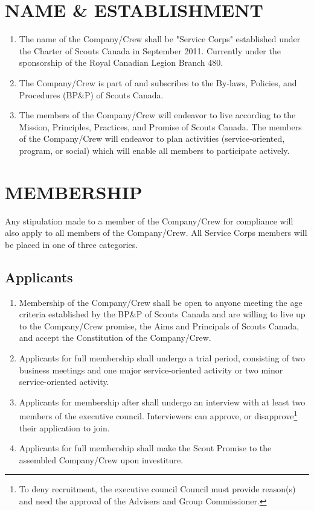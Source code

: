 \documentclass{Service_Corps_Document}
\begin{document}
\def \Title {Constitution}
\def \Company {Service Corps}
\def \versionNumber {4.0}
\stdFooter
\begin{titlepage}
	\stdTitlePage
\end{titlepage}

\tableofcontents	
		
\newpage
\section{NAME \& ESTABLISHMENT}
\begin{enumerate}
	\item The name of the Company/Crew shall be "Service Corps" established under the Charter of Scouts Canada in September 2011.
	Currently under the sponsorship of the Royal Canadian Legion Branch 480.
	\item The Company/Crew is part of and subscribes to the By-laws, Policies, and Procedures (BP\&P) of Scouts Canada.
	\item The members of the Company/Crew will endeavor to live according to the Mission, Principles, Practices, and Promise of Scouts Canada.
	The members of the Company/Crew will endeavor to plan activities (service-oriented, program, or social) which will enable all members to participate actively.
\end{enumerate}	
\section{MEMBERSHIP}
Any stipulation made to a member of the Company/Crew for compliance will also apply to all members of the Company/Crew.
All Service Corps members will be placed in one of three categories.
\subsection{Applicants}
\begin{enumerate}
	\item Membership of the Company/Crew shall be open to anyone meeting the age criteria established by the BP\&P of Scouts Canada and are willing to live up to the Company/Crew promise, the Aims and Principals of Scouts Canada, and accept the Constitution of the Company/Crew. 
	\item Applicants for full membership shall undergo a trial period, consisting of two business meetings and one major service-oriented activity or two minor service-oriented activity.
	\item Applicants for membership after shall undergo an interview with at least two members of the executive council.
	Interviewers can approve, or disapprove\footnote{To deny recruitment, the executive council Council must provide reason(s) and need the approval of the Advisers and Group Commissioner.} their application to join.
	\item Applicants for full membership shall make the Scout Promise to the assembled Company/Crew upon investiture. 
\end{enumerate}
\end{document}
